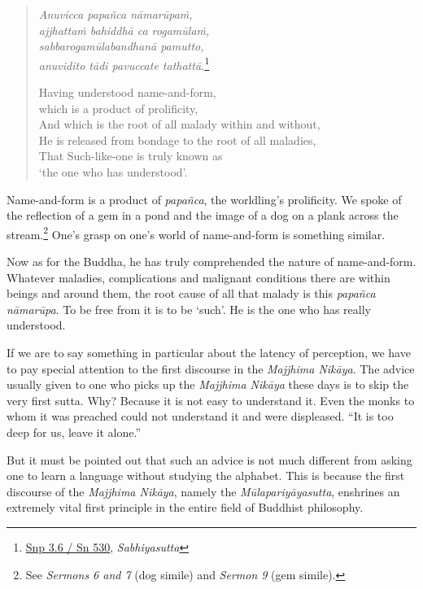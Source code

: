 \begin{quote}
\emph{Anuvicca papañca nāmarūpaṁ,}\\
\emph{ajjhattaṁ bahiddhā ca rogamūlaṁ,}\\
\emph{sabbarogamūlabandhanā pamutto,}\\
\emph{anuvidito tādi pavuccate tathattā.}\footnote{\href{https://suttacentral.net/snp3.6/pli/ms}{Snp 3.6 / Sn 530}, \emph{Sabhiyasutta}}

Having understood name-and-form,\\
\vin which is a product of prolificity,\\
And which is the root of all malady within and without,\\
He is released from bondage to the root of all maladies,\\
That Such-like-one is truly known as\\
\vin `the one who has understood'.
\end{quote}

Name-and-form is a product of \emph{papañca}, the worldling's prolificity. We spoke of the reflection of a gem in a pond and the image of a dog on a plank across the stream.\footnote{See \emph{Sermons 6 and 7} (dog simile) and \emph{Sermon 9} (gem simile).} One's grasp on one's world of name-and-form is something similar.

Now as for the Buddha, he has truly comprehended the nature of name-and-form. Whatever maladies, complications and malignant conditions there are within beings and around them, the root cause of all that malady is this \emph{papañca nāmarūpa}. To be free from it is to be `such'. He is the one who has really understood.

If we are to say something in particular about the latency of perception, we have to pay special attention to the first discourse in the \emph{Majjhima Nikāya}. The advice usually given to one who picks up the \emph{Majjhima Nikāya} these days is to skip the very first sutta. Why? Because it is not easy to understand it. Even the monks to whom it was preached could not understand it and were displeased. ``It is too deep for us, leave it alone.''

But it must be pointed out that such an advice is not much different from asking one to learn a language without studying the alphabet. This is because the first discourse of the \emph{Majjhima Nikāya}, namely the \emph{Mūlapariyāyasutta}, enshrines an extremely vital first principle in the entire field of Buddhist philosophy.

